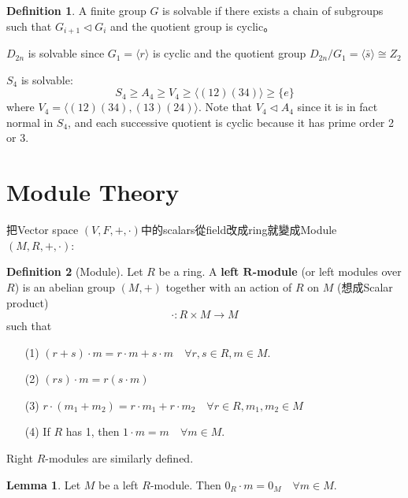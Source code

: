 \documentclass[12pt]{article}
\theoremstyle{definition}
\newtheorem{lem}{Lemma}
\newtheorem{dfn}{Definition}
\begin{document}
\begin{dfn}
	A finite group $G$ is solvable if there exists a chain of subgroups such that $G_{i+1}\lhd G_i$ and the quotient group is cyclic。
\end{dfn}

\begin{ex}
	$D_{2n}$ is solvable since $G_1=\langle r \rangle$ is cyclic and the quotient group $D_{2n}/G_1=\langle \bar{s}\rangle\cong Z_2$
\end{ex}

\begin{ex}
	$S_4$ is solvable:
	\[S_4\ge A_4 \ge V_4 \ge \langle(12)(34)\rangle\ge\{e\}\]
	where $V_4=\langle(12)(34),(13)(24)\rangle$. Note that $V_4\lhd A_4$ since it is in fact normal in $S_4$,
	and each successive quotient is cyclic because it has prime order 2 or 3.
\end{ex}


\clearpage
\section{Module Theory}

把Vector space $(V,F,+,\cdot)$中的scalars從field改成ring就變成Module $(M,R,+,\cdot)$:
\begin{dfn}[Module]
	Let $R$ be a ring.
	A \textbf{left $\bm{R}$-module} (or left modules over $R$) is an abelian group $(M,+)$ together with an action of $R$ on $M$
	(想成Scalar product)
	\[\cdot: R \times M \to M\]
	such that
	\begin{enumerate}
		\item[(1)] $(r + s) \cdot m = r \cdot m + s \cdot m \quad \forall r, s \in R, m \in M$.

		\item[(2)] $(r s) \cdot m = r (s \cdot m)$

		\item[(3)] $r\cdot (m_1 + m_2) = r \cdot m_1 + r \cdot m_2 \quad \forall r \in R, m_1, m_2 \in M$

		\item[(4)] If $R$ has 1, then $1 \cdot m = m \quad \forall m \in M$.
	\end{enumerate}
	Right $R$-modules are similarly defined.
\end{dfn}
\begin{lem}
	Let $M$ be a left $R$-module.
	Then $0_R \cdot m = 0_M \quad \forall m \in M$.
\end{lem}
\end{document}

